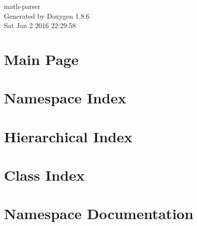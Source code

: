 \documentclass[twoside]{book}
\newcommand{\clearemptydoublepage}{%
  \newpage{\pagestyle{empty}\cleardoublepage}%
}
\begin{document}
\hypersetup{pageanchor=false}
\begin{titlepage}
\vspace*{7cm}
\begin{center}%
{\Large math-\/parser }\\
\vspace*{1cm}
{\large Generated by Doxygen 1.8.6}\\
\vspace*{0.5cm}
{\small Sat Jan 2 2016 22:29:58}\\
\end{center}
\end{titlepage}
\clearemptydoublepage
\tableofcontents
\clearemptydoublepage
{}
\hypersetup{pageanchor=true}

\chapter{Main Page}
\label{index}\hypertarget{index}{}
\chapter{Namespace Index}

\chapter{Hierarchical Index}

\chapter{Class Index}

\chapter{Namespace Documentation}





\end{document}
